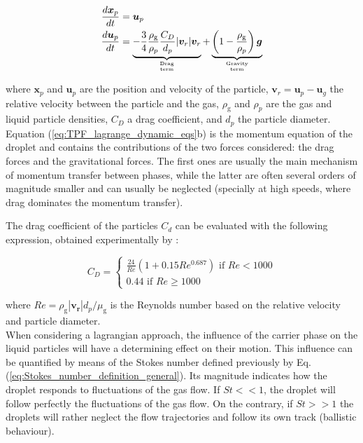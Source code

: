 \begin{subequations}
\label{eq:TPF_lagrange_dynamic_eqs}
\begin{align}
\frac{d \boldsymbol{x}_p}{d t} &= \boldsymbol{u}_p \\
\frac{d \boldsymbol{u}_p}{d t} &= \underbrace{ - \frac{3}{4} \frac{\rho_\mathrm{g}}{\rho_p} \frac{C_D}{d_p} | \boldsymbol{v}_r | \boldsymbol{v}_r }_{\text{Drag}\atop\text{term}}  + \underbrace{ \left( 1 - \frac{\rho_\mathrm{g}}{\rho_p} \right) \boldsymbol{g} }_{\text{Gravity}\atop\text{term}} 
\end{align}
\end{subequations}

where $\textbf{x}_p$ and $\textbf{u}_p$ are the position and velocity of the particle, $\textbf{v}_r = \boldsymbol{u}_p  - \boldsymbol{u}_g$ the relative velocity between the particle and the gas, $\rho_\mathrm{g}$ and $\rho_p$ are the gas and liquid particle densities, $C_D$ a drag coefficient, and $d_p$ the particle diameter. Equation (\ref{eq:TPF_lagrange_dynamic_eqs}b) is the momentum equation of the droplet and contains the contributions of the two forces considered: the drag forces and the gravitational forces. The first ones are usually the main mechanism of momentum transfer between phases, while the latter are often several orders of magnitude smaller and can usually be neglected (specially at high speeds, where drag dominates the momentum transfer). 

The drag coefficient of the particles $C_d$ can be evaluated with the following expression, obtained experimentally by :

\begin{equation}
\label{eq:Re_CD_droplet}
C_D =
\left\{
    \begin{split}
     \frac{24}{Re} \left( 1 + 0.15 Re^{0.687} \right)\,\,\mathrm{if}\,\,Re < 1000 \\ 
    0.44\,\,\mathrm{if}\,\,Re \geq 1000 
    \end{split}
\right.
\end{equation}

where $Re = \rho_\mathrm{g} | \boldsymbol{v_r} | d_p / \mu_\mathrm{g} $ is the Reynolds number based on the relative velocity and particle diameter. \\

When considering a lagrangian approach, the influence of the carrier phase on the liquid particles will have a determining effect on their motion. This influence can be quantified by means of the Stokes number defined previously by Eq. (\ref{eq:Stokes_number_definition_general}). Its magnitude indicates how the droplet responds to fluctuations of the gas flow. If $St << 1$, the droplet will follow perfectly the fluctuations of the gas flow. On the contrary, if $St >> 1$ the droplets will rather neglect the flow trajectories and follow its own track (ballistic behaviour). 

